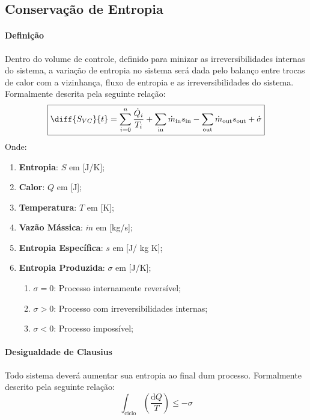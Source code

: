 \documentclass{article}
\begin{document}
        \subsection{Conservação de Entropia}
            \paragraph{Definição}Dentro do volume de controle, definido para minizar as irreversibilidades internas do sistema, a variação de entropia no sistema será dada pelo balanço entre trocas de calor com a vizinhança, fluxo de entropia e as irreversibilidades do sistema. Formalmente descrita pela seguinte relação:
                \[
                    \boxed{
                        \diff{S_{VC}}{t} = \sum\limits_{i = 0}^{n} \frac{\dot{Q}_{i}}{T_{i}} +
                                           \sum\limits_\text{in} \dot{m}_\text{in}s_\text{in} -
                                           \sum\limits_\text{out} \dot{m}_\text{out}s_\text{out} +
                                           \dot{\sigma}
                    }\]
            Onde:
                \begin{enumerate}[noitemsep]
                    \item \textbf{Entropia}: $S$ em [J/K];
                    \item \textbf{Calor}: $Q$ em [J];
                    \item \textbf{Temperatura}: $T$ em [K];
                    \item \textbf{Vazão Mássica}: $\dot{m}$ em [kg/s];
                    \item \textbf{Entropia Específica}: $s$ em [J/ kg K];
                    \item \textbf{Entropia Produzida}: $\sigma$ em [J/K];
                        \begin{enumerate}[noitemsep]
                            \item $\sigma = 0$: Processo internamente reversível;
                            \item $\sigma > 0$: Processo com irreversibilidades internas;
                            \item $\sigma < 0$: Processo impossível;
                        \end{enumerate}
                \end{enumerate}

            \paragraph{Desigualdade de Clausius}Todo sistema deverá aumentar sua entropia ao final dum processo. Formalmente descrito pela seguinte relação:
                \[\boxed{\int_{\text{ciclo}} \left(\frac{\text{d}Q}{T}\right) \leq -\sigma}\]
\end{document}
